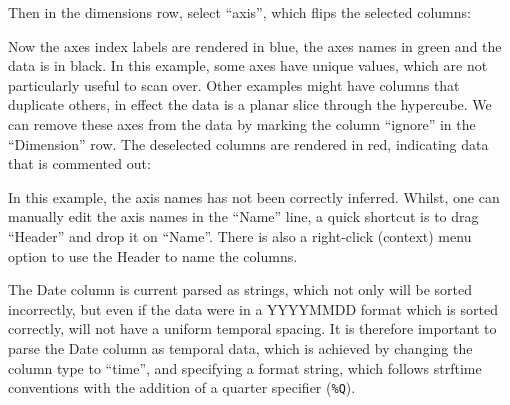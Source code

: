 Then in the dimensions row, select ``axis'', which flips the selected
columns:
\begin{center}
\par\end{center}

Now the axes index labels are rendered in blue, the axes names in
green and the data is in black. In this example, some axes have unique
values, which are not particularly useful to scan over. Other examples
might have columns that duplicate others, in effect the data is a
planar slice through the hypercube. We can remove these axes from
the data by marking the column ``ignore'' in the ``Dimension''
row. The deselected columns are rendered in red, indicating data that
is commented out:
\begin{center}
\par\end{center}

In this example, the axis names has not been correctly inferred. Whilst,
one can manually edit the axis names in the ``Name'' line, a quick
shortcut is to drag ``Header'' and drop it on ``Name''. There
is also a right-click (context) menu option to use the Header to name
the columns.
\begin{center}
\par\end{center}

The Date column is current parsed as strings, which not only will
be sorted incorrectly, but even if the data were in a YYYYMMDD format
which is sorted correctly, will not have a uniform temporal spacing.
It is therefore important to parse the Date column as temporal data,
which is achieved by changing the column type to ``time'', and specifying
a format string, which follows strftime conventions with the addition
of a quarter specifier (\verb+%Q+). \label{strftime format specifier}

